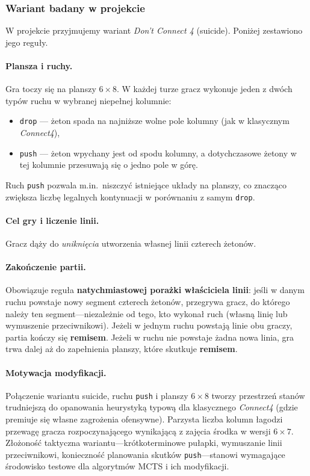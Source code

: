 \documentclass[11pt, a4paper]{article}
\begin{document}
\subsubsection{Wariant badany w projekcie}

W projekcie przyjmujemy wariant \textit{Don't Connect 4} (suicide). Poniżej zestawiono jego reguły.

\paragraph{Plansza i ruchy.}
Gra toczy się na planszy $6 \times 8$. W każdej turze gracz wykonuje jeden z dwóch typów ruchu w wybranej niepełnej kolumnie:
\begin{itemize}
    \item \texttt{drop} --- żeton spada na najniższe wolne pole kolumny (jak w klasycznym \textit{Connect4}),
    \item \texttt{push} --- żeton wpychany jest od spodu kolumny, a dotychczasowe żetony w tej kolumnie przesuwają się o jedno pole w górę.
\end{itemize}
Ruch \texttt{push} pozwala m.in.\ niszczyć istniejące układy na planszy, co znacząco zwiększa liczbę legalnych kontynuacji w porównaniu z samym \texttt{drop}.

\paragraph{Cel gry i liczenie linii.}
Gracz dąży do \emph{uniknięcia} utworzenia własnej linii czterech żetonów. 
\paragraph{Zakończenie partii.}
Obowiązuje reguła \textbf{natychmiastowej porażki właściciela linii}: jeśli w danym ruchu powstaje nowy segment czterech żetonów, przegrywa gracz, do którego należy ten segment---niezależnie od tego, kto wykonał ruch (własną linię lub wymuszenie przeciwnikowi). Jeżeli w jednym ruchu powstają linie obu graczy, partia kończy się \textbf{remisem}. Jeżeli w ruchu nie powstaje żadna nowa linia, gra trwa dalej aż do zapełnienia planszy, które skutkuje \textbf{remisem}.

\paragraph{Motywacja modyfikacji.}
Połączenie wariantu suicide, ruchu \texttt{push} i planszy $6 \times 8$ tworzy przestrzeń stanów trudniejszą do opanowania heurystyką typową dla klasycznego \textit{Connect4} (gdzie premiuje się własne zagrożenia ofensywne). Parzysta liczba kolumn łagodzi przewagę gracza rozpoczynającego wynikającą z zajęcia środka w wersji $6 \times 7$. Złożoność taktyczna wariantu---krótkoterminowe pułapki, wymuszanie linii przeciwnikowi, konieczność planowania skutków \texttt{push}---stanowi wymagające środowisko testowe dla algorytmów MCTS i ich modyfikacji.
\end{document}
